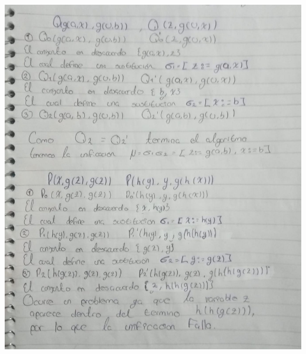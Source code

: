 \documentclass[12pt,letterpaper]{article}
\begin{document}
\begin{enumerate}
  \begin{center}
    \hspace{-1.2cm} \includegraphics[width=\textwidth,height=0.9\textheight,keepaspectratio]{ejercicio5.png}
  \end{center}
  

\end{enumerate}
\end{document}
